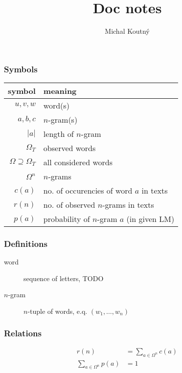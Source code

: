 \documentclass[11pt]{article}
\title{Doc notes}
\author{Michal Koutný}
\date{}
\begin{document}
\maketitle

\subsubsection{Symbols} 
\begin{tabular}{|r|l|}
    \hline
    symbol & meaning\\
    \hline
    $u, v, w$ & word(s)\\
    $a, b, c$ & $n$-gram(s)\\
    $|a|$ & length of $n$-gram\\
    $\Omega_T$ & observed words\\
    $\Omega \supseteq \Omega_T$ & all considered words\\
    $\Omega^n$ & $n$-grams\\
    $c(a)$ & no. of occurencies of word $a$ in texts\\
    $r(n)$ & no. of observed $n$-grams in texts\\
    $p(a)$ & probability of $n$-gram $a$ (in given LM)\\
    \hline
\end{tabular}

\subsubsection{Definitions} 
\begin{description}
    \item[word] sequence of letters, TODO
    \item[$n$-gram] $n$-tuple of words, e.q. $(w_1, \dots, w_n)$    
\end{description}

\subsubsection{Relations} 
\begin{align*}
    r(n) &= \sum_{a \in \Omega^n} c(a)\\
    \sum_{a \in \Omega^n} p(a) &= 1
\end{align*}
\end{document}
